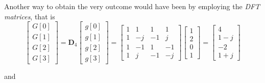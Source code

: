 \documentclass[\documentfontsize, twocolumn]{\classname}
\begin{document}
Another way to obtain the very outcome would have been by employing the \emph{DFT matrices}, that is
\begin{equation*}
    \begin{bmatrix} G[0] \\ G[1] \\ G[2] \\ G[3] \end{bmatrix}
        =
        \bm{D}_4
        \begin{bmatrix} g[0] \\ g[1] \\ g[2] \\ g[3] \end{bmatrix}
        =
        \begin{bmatrix}
            1 & 1 & 1 & 1 \\
            1 & -j & -1 & j \\
            1 & -1 & 1 & -1 \\
            1 & j & -1 & -j
        \end{bmatrix}
        \begin{bmatrix} 1 \\ 2 \\ 0 \\ 1 \end{bmatrix}
        =
        \begin{bmatrix}
            4 \\
            1 - j \\
            -2 \\
            1 + j
        \end{bmatrix}
\end{equation*}

and
\end{document}
